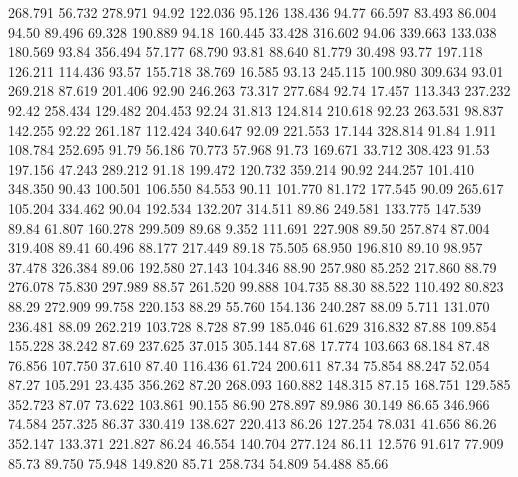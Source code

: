  268.791   56.732  278.971        94.92
 122.036   95.126  138.436        94.77
  66.597   83.493   86.004        94.50
  89.496   69.328  190.889        94.18
 160.445   33.428  316.602        94.06
 339.663  133.038  180.569        93.84
 356.494   57.177   68.790        93.81
  88.640   81.779   30.498        93.77
 197.118  126.211  114.436        93.57
 155.718   38.769   16.585        93.13
 245.115  100.980  309.634        93.01
 269.218   87.619  201.406        92.90
 246.263   73.317  277.684        92.74
  17.457  113.343  237.232        92.42
 258.434  129.482  204.453        92.24
  31.813  124.814  210.618        92.23
 263.531   98.837  142.255        92.22
 261.187  112.424  340.647        92.09
 221.553   17.144  328.814        91.84
   1.911  108.784  252.695        91.79
  56.186   70.773   57.968        91.73
 169.671   33.712  308.423        91.53
 197.156   47.243  289.212        91.18
 199.472  120.732  359.214        90.92
 244.257  101.410  348.350        90.43
 100.501  106.550   84.553        90.11
 101.770   81.172  177.545        90.09
 265.617  105.204  334.462        90.04
 192.534  132.207  314.511        89.86
 249.581  133.775  147.539        89.84
  61.807  160.278  299.509        89.68
   9.352  111.691  227.908        89.50
 257.874   87.004  319.408        89.41
  60.496   88.177  217.449        89.18
  75.505   68.950  196.810        89.10
  98.957   37.478  326.384        89.06
 192.580   27.143  104.346        88.90
 257.980   85.252  217.860        88.79
 276.078   75.830  297.989        88.57
 261.520   99.888  104.735        88.30
  88.522  110.492   80.823        88.29
 272.909   99.758  220.153        88.29
  55.760  154.136  240.287        88.09
   5.711  131.070  236.481        88.09
 262.219  103.728    8.728        87.99
 185.046   61.629  316.832        87.88
 109.854  155.228   38.242        87.69
 237.625   37.015  305.144        87.68
  17.774  103.663   68.184        87.48
  76.856  107.750   37.610        87.40
 116.436   61.724  200.611        87.34
  75.854   88.247   52.054        87.27
 105.291   23.435  356.262        87.20
 268.093  160.882  148.315        87.15
 168.751  129.585  352.723        87.07
  73.622  103.861   90.155        86.90
 278.897   89.986   30.149        86.65
 346.966   74.584  257.325        86.37
 330.419  138.627  220.413        86.26
 127.254   78.031   41.656        86.26
 352.147  133.371  221.827        86.24
  46.554  140.704  277.124        86.11
  12.576   91.617   77.909        85.73
  89.750   75.948  149.820        85.71
 258.734   54.809   54.488        85.66
